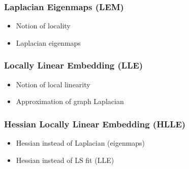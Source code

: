 
\subsubsection{Laplacian Eigenmaps (LEM)}
\label{laplace}

\begin{itemize}
  \item Notion of locality
  \item Laplacian eigenmaps
\end{itemize}


\subsubsection{Locally Linear Embedding (LLE)}
\label{lle}

\begin{itemize}
  \item Notion of local linearity
  \item Approximation of graph Laplacian
\end{itemize}



\subsubsection{Hessian Locally Linear Embedding (HLLE)}
\label{hlle}

\begin{itemize}
  \item Hessian instead of Laplacian (eigenmaps)
  \item Hessian instead of LS fit (LLE)
\end{itemize}
